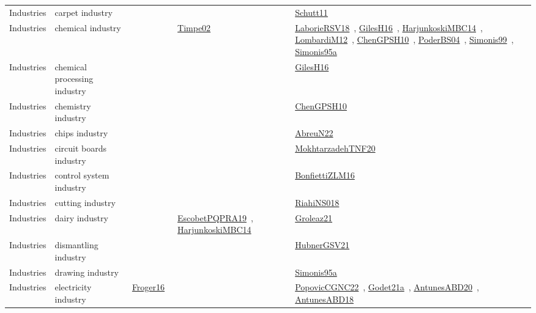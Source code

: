 {\begin{longtable}{lp{3cm}>{\raggedright\arraybackslash}p{6cm}>{\raggedright\arraybackslash}p{6cm}>{\raggedright\arraybackslash}p{8cm}}
Industries & carpet industry &  &  & \href{../works/Schutt11.pdf}{Schutt11}~\cite{Schutt11}\\
Industries & chemical industry &  & \href{../works/Timpe02.pdf}{Timpe02}~\cite{Timpe02} & \href{../works/LaborieRSV18.pdf}{LaborieRSV18}~\cite{LaborieRSV18}, \href{../works/GilesH16.pdf}{GilesH16}~\cite{GilesH16}, \href{../works/HarjunkoskiMBC14.pdf}{HarjunkoskiMBC14}~\cite{HarjunkoskiMBC14}, \href{../works/LombardiM12.pdf}{LombardiM12}~\cite{LombardiM12}, \href{../works/ChenGPSH10.pdf}{ChenGPSH10}~\cite{ChenGPSH10}, \href{../works/PoderBS04.pdf}{PoderBS04}~\cite{PoderBS04}, \href{../works/Simonis99.pdf}{Simonis99}~\cite{Simonis99}, \href{../works/Simonis95a.pdf}{Simonis95a}~\cite{Simonis95a}\\
Industries & chemical processing industry &  &  & \href{../works/GilesH16.pdf}{GilesH16}~\cite{GilesH16}\\
Industries & chemistry industry &  &  & \href{../works/ChenGPSH10.pdf}{ChenGPSH10}~\cite{ChenGPSH10}\\
Industries & chips industry &  &  & \href{../works/AbreuN22.pdf}{AbreuN22}~\cite{AbreuN22}\\
Industries & circuit boards industry &  &  & \href{../works/MokhtarzadehTNF20.pdf}{MokhtarzadehTNF20}~\cite{MokhtarzadehTNF20}\\
Industries & control system industry &  &  & \href{../works/BonfiettiZLM16.pdf}{BonfiettiZLM16}~\cite{BonfiettiZLM16}\\
Industries & cutting industry &  &  & \href{../works/RiahiNS018.pdf}{RiahiNS018}~\cite{RiahiNS018}\\
Industries & dairy industry &  & \href{../works/EscobetPQPRA19.pdf}{EscobetPQPRA19}~\cite{EscobetPQPRA19}, \href{../works/HarjunkoskiMBC14.pdf}{HarjunkoskiMBC14}~\cite{HarjunkoskiMBC14} & \href{../works/Groleaz21.pdf}{Groleaz21}~\cite{Groleaz21}\\
Industries & dismantling industry &  &  & \href{../works/HubnerGSV21.pdf}{HubnerGSV21}~\cite{HubnerGSV21}\\
Industries & drawing industry &  &  & \href{../works/Simonis95a.pdf}{Simonis95a}~\cite{Simonis95a}\\
Industries & electricity industry & \href{../works/Froger16.pdf}{Froger16}~\cite{Froger16} &  & \href{../works/PopovicCGNC22.pdf}{PopovicCGNC22}~\cite{PopovicCGNC22}, \href{../works/Godet21a.pdf}{Godet21a}~\cite{Godet21a}, \href{../works/AntunesABD20.pdf}{AntunesABD20}~\cite{AntunesABD20}, \href{../works/AntunesABD18.pdf}{AntunesABD18}~\cite{AntunesABD18}\\

\end{longtable}}
